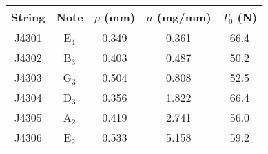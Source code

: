 \begin{tabular}{ccccc}
\toprule
String & Note & $\rho$ (mm) & $\mu$ (mg/mm) & $T_0$ (N) \\
\midrule
J4301 & E$_{4}$ & 0.349 & 0.361 & 66.4 \\
J4302 & B$_{3}$ & 0.403 & 0.487 & 50.2 \\
J4303 & G$_{3}$ & 0.504 & 0.808 & 52.5 \\
J4304 & D$_{3}$ & 0.356 & 1.822 & 66.4 \\
J4305 & A$_{2}$ & 0.419 & 2.741 & 56.0 \\
J4306 & E$_{2}$ & 0.533 & 5.158 & 59.2 \\
\bottomrule
\end{tabular}
